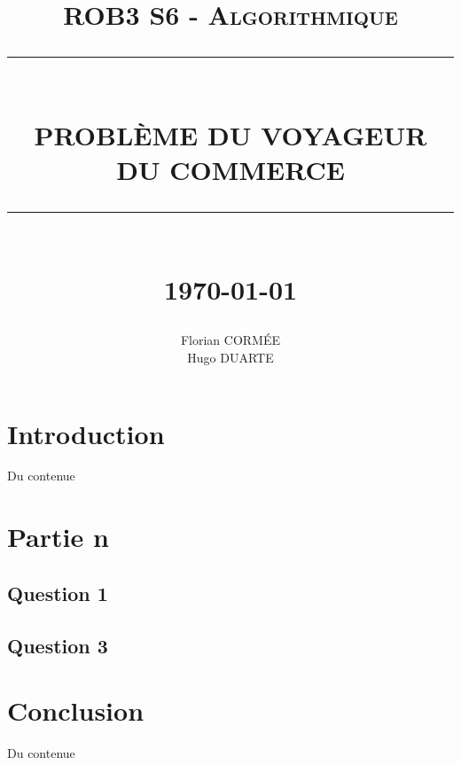 \documentclass[12pt]{report}
\newcommand{\HRule}[1]{\rule{\linewidth}{#1}}
\begin{document}
\title{
	    \normalsize \textsc{ROB3 S6 - Algorithmique}
		\\ [1.0cm]
		\HRule{0.5pt} \\
		\LARGE \textbf{\uppercase{Problème du voyageur\\du commerce}}
		\HRule{2pt} \\ [0.5cm]
		\normalsize \today{} \vspace*{5\baselineskip}}
\date{}
\author{
		Florian CORMÉE \\
		Hugo DUARTE}
\maketitle
\tableofcontents
\newpage

\section*{Introduction}

Du contenue

\section*{Partie n} %

\subsection*{Question 1}


\subsection*{Question 3}



\section*{Conclusion}

Du contenue
\end{document}
